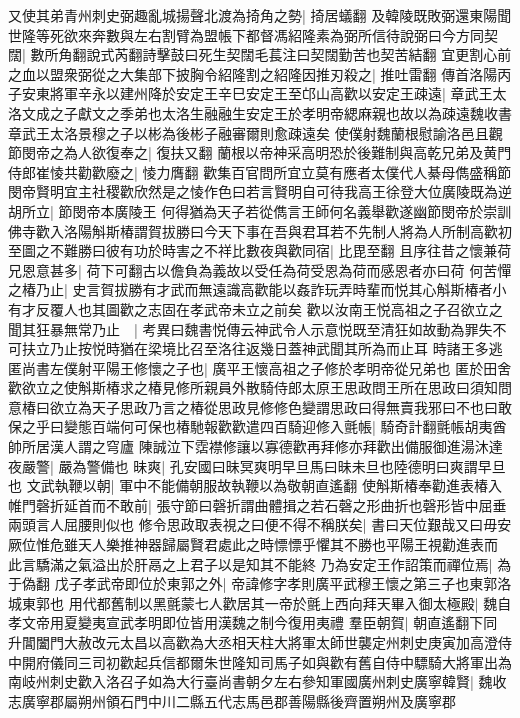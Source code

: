 又使其弟青州刺史弼趣亂城揚聲北渡為掎角之勢|{
	掎居蟻翻}
及韓陵既敗弼還東陽聞世隆等死欲來奔數與左右割臂為盟帳下都督馮紹隆素為弼所信待說弼曰今方同契闊|{
	數所角翻說式芮翻詩擊鼓曰死生契闊毛萇注曰契闊勤苦也契苦結翻}
宜更割心前之血以盟衆弼從之大集部下披胸令紹隆割之紹隆因推刃殺之|{
	推吐雷翻}
傳首洛陽丙子安東將軍辛永以建州降於安定王辛巳安定王至邙山高歡以安定王疎遠|{
	章武王太洛文成之子獻文之季弟也太洛生融融生安定王於孝明帝緦麻親也故以為疎遠魏收書章武王太洛景穆之子以彬為後彬子融審爾則愈疎遠矣}
使僕射魏蘭根慰諭洛邑且觀節閔帝之為人欲復奉之|{
	復扶又翻}
蘭根以帝神采高明恐於後難制與高乾兄弟及黄門侍郎崔㥄共勸歡廢之|{
	㥄力膺翻}
歡集百官問所宜立莫有應者太僕代人綦母儁盛稱節閔帝賢明宜主社稷歡欣然是之㥄作色曰若言賢明自可待我高王徐登大位廣陵既為逆胡所立|{
	節閔帝本廣陵王}
何得猶為天子若從儁言王師何名義舉歡遂幽節閔帝於崇訓佛寺歡入洛陽斛斯椿謂賀拔勝曰今天下事在吾與君耳若不先制人將為人所制高歡初至圖之不難勝曰彼有功於時害之不祥比數夜與歡同宿|{
	比毘至翻}
且序往昔之懷兼荷兄恩意甚多|{
	荷下可翻古以儋負為義故以受任為荷受恩為荷而感恩者亦曰荷}
何苦憚之椿乃止|{
	史言賀拔勝有才武而無遠識高歡能以姦詐玩弄時輩而悦其心斛斯椿者小有才反覆人也其圖歡之志固在孝武帝未立之前矣}
歡以汝南王悦高祖之子召欲立之聞其狂暴無常乃止　|{
	考異曰魏書悦傳云神武令人示意悦既至清狂如故動為罪失不可扶立乃止按悦時猶在梁境比召至洛往返幾日蓋神武聞其所為而止耳}
時諸王多逃匿尚書左僕射平陽王修懷之子也|{
	廣平王懷高祖之子修於孝明帝從兄弟也}
匿於田舍歡欲立之使斛斯椿求之椿見修所親員外散騎侍郎太原王思政問王所在思政曰須知問意椿曰欲立為天子思政乃言之椿從思政見修修色變謂思政曰得無賣我邪曰不也曰敢保之乎曰變態百端何可保也椿馳報歡歡遣四百騎迎修入氈帳|{
	騎奇計翻氈帳胡夷酋帥所居漢人謂之穹廬}
陳誠泣下霑襟修讓以寡德歡再拜修亦拜歡出備服御進湯沐達夜嚴警|{
	嚴為警備也}
昧爽|{
	孔安國曰昧冥爽明早旦馬曰昧未旦也陸德明曰爽謂早旦也}
文武執鞭以朝|{
	軍中不能備朝服故執鞭以為敬朝直遙翻}
使斛斯椿奉勸進表椿入帷門磬折延首而不敢前|{
	張守節曰磬折謂曲體揖之若石磬之形曲折也磬形皆中屈垂兩頭言人屈腰則似也}
修令思政取表視之曰便不得不稱朕矣|{
	書曰天位艱哉又曰毋安厥位惟危雖天人樂推神器歸屬賢君處此之時慓慓乎懼其不勝也平陽王視勸進表而此言驕滿之氣溢出於肝鬲之上君子以是知其不能終}
乃為安定王作詔策而禪位焉|{
	為于偽翻}
戊子孝武帝即位於東郭之外|{
	帝諱修字孝則廣平武穆王懷之第三子也東郭洛城東郭也}
用代都舊制以黑氈蒙七人歡居其一帝於氈上西向拜天畢入御太極殿|{
	魏自孝文帝用夏變夷宣武孝明即位皆用漢魏之制今復用夷禮}
羣臣朝賀|{
	朝直遙翻下同}
升閶闔門大赦改元太昌以高歡為大丞相天柱大將軍太師世襲定州刺史庚寅加高澄侍中開府儀同三司初歡起兵信都爾朱世隆知司馬子如與歡有舊自侍中驃騎大將軍出為南岐州刺史歡入洛召子如為大行臺尚書朝夕左右參知軍國廣州刺史廣寧韓賢|{
	魏收志廣寧郡屬朔州領石門中川二縣五代志馬邑郡善陽縣後齊置朔州及廣寧郡}
